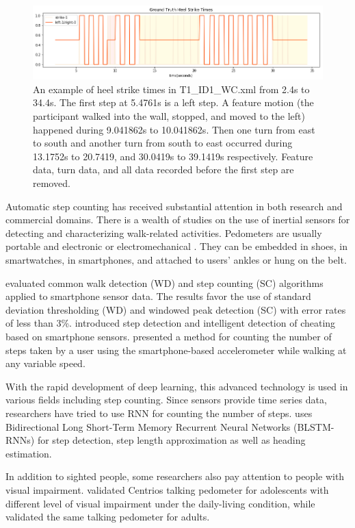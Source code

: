 \documentclass[11pt]{article}
\begin{document}
\begin{figure}[htb]
\centering
\includegraphics[scale=0.5]{ground_truth_2}
\caption{An example of heel strike times in T1\_ID1\_WC.xml from 2.4s to 34.4s. The first step at 5.4761s is a left step. A feature motion (the participant walked into the wall, stopped, and moved to the left) happened during 9.041862s to 10.041862s. Then one turn from east to south and another turn from south to east occurred during 13.1752s to 20.7419, and 30.0419s to 39.1419s respectively. Feature data, turn data, and all data recorded before the first step are removed.}
\label{fig:ground_truth}
\end{figure}


Automatic step counting has received substantial attention in both research and commercial domains. There is a wealth of studies on the use of inertial sensors for detecting and characterizing walk-related activities. Pedometers are usually portable and electronic or electromechanical \cite{wiki:pedometer}. They can be embedded in shoes, in smartwatches, in smartphones, and attached to users' ankles or hung on the belt.

\cite{brajdic2013walk} evaluated common walk detection (WD) and step counting (SC) algorithms applied to smartphone sensor data. The results favor the use of standard deviation thresholding (WD) and windowed peak detection (SC) with error rates of less than 3\%.
\cite{tomlein2012advanced} introduced step detection and intelligent detection of cheating based on smartphone sensors.
\cite{naqvib2012step} presented a method for counting the number of steps taken by a user using the smartphone-based accelerometer while walking at any variable speed.

With the rapid development of deep learning, this advanced technology is used in various fields including step counting. Since sensors provide time series data, researchers have tried to use RNN for counting the number of steps. \cite{edel2015advanced} uses Bidirectional Long Short-Term Memory Recurrent Neural Networks (BLSTM-RNNs) for step detection, step length approximation as well as heading estimation.

In addition to sighted people, some researchers also pay attention to people with visual impairment. \cite{haegele2015validation} validated Centrios talking pedometer for adolescents with different level of visual impairment under the daily-living condition, while  \cite{holbrook2011validation} validated the same talking pedometer for adults.
\end{document}
